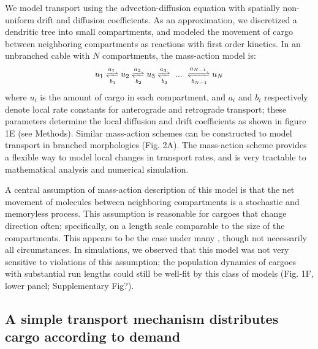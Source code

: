 \documentclass[11pt]{wlpeerj}
\begin{document}
We model transport using the advection-diffusion equation with spatially non-uniform drift and diffusion coefficients. As an approximation, we discretized a dendritic tree into small compartments, and modeled the movement of cargo between neighboring compartments as reactions with first order kinetics. In an unbranched cable with $N$ compartments, the mass-action model is:
\begin{equation}
u_1 \xrightleftharpoons[b_1]{a_1} u_2 \xrightleftharpoons[b_2]{a_2} u_3 \xrightleftharpoons[b_3]{a_3} ~...~ \xrightleftharpoons[b_{N-1}]{a_{N-1}} u_N
\end{equation}
where $u_i$ is the amount of cargo in each compartment, and $a_i$ and $b_i$ respectively denote local rate constants for anterograde and retrograde transport; these parameters determine the local diffusion and drift coefficients as shown in figure 1E (see Methods). Similar mass-action schemes can be constructed to model transport in branched morphologies (Fig. 2A). The mass-action scheme provides a flexible way to model local changes in transport rates, and is very tractable to mathematical analysis and numerical simulation.

A central assumption of mass-action description of this model is that the net movement of molecules between neighboring compartments is a stochastic and memoryless process. This assumption is reasonable for cargoes that change direction often; specifically, on a length scale comparable to the size of the compartments. This appears to be the case under many \citep{Muller_2008,Verbrugge_2009}, though not necessarily all \citep{Dynes_2007,Soundararajan_2014} circumstances. In simulations, we observed that this model was not very sensitive to violations of this assumption; the population dynamics of cargoes with substantial run lengths could still be well-fit by this class of models (Fig. 1F, lower panel; Supplementary Fig?). 

\subsection*{A simple transport mechanism distributes cargo according to demand}
\end{document}
